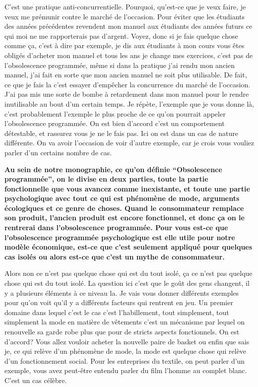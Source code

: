 \begin{small}
C'est une pratique anti-concurrentielle. Pourquoi, qu'est-ce que je veux faire, je veux me prémunir contre le marché de l'occasion. Pour éviter que les étudiants des années précédentes revendent mon manuel aux étudiants des années futurs ce qui moi ne me rapporterais pas d'argent. Voyez, donc si je fais quelque chose comme ça, c'est à dire par exemple, je dis aux étudiants à mon cours vous êtes obligés d'acheter mon manuel et tous les ans je change mes exercices, c'est pas de l'obsolescence programmée, même si dans la pratique j'ai rendu mon ancien manuel, j'ai fait en sorte que mon ancien manuel ne soit plus utilisable. De fait, ce que je fais la c'est essayer d'empêcher la concurrence du marché de l'occasion. J'ai pas mis une sorte de bombe à retardement dans mon manuel pour le rendre inutilisable au bout d'un certain temps. Je répète, l'exemple que je vous donne là, c'est probablement l'exemple le plus proche de ce qu'on pourrait appeler l'obsolescence programmée. On est bien d'accord c'est un comportement détestable, et rassurez vous je ne le fais pas. Ici on est dans un cas de nature différente. On va avoir l'occasion de voir d'autre exemple, car je crois vous vouliez parler d'un certains nombre de cas.

\smallbreak\textbf{
Au sein de notre monographie, ce qu'on définie “Obsolescence programmée”, on le divise en deux parties, toute la partie fonctionnelle que vous avancez comme inexistante, et toute une partie psychologique avec tout ce qui est phénomène de mode, arguments écologiques et ce genre de choses. Quand le consommateur remplace son produit, l'ancien produit est encore fonctionnel, et donc ça on le rentrerai dans l'obsolescence programmée. Pour vous est-ce que l'obsolescence programmée psychologique est elle utile pour notre modèle économique, est-ce que c'est seulement appliqué pour quelques cas isolés ou alors est-ce que c'est un mythe de consommateur.
}\smallbreak

Alors non ce n'est pas quelque chose qui est du tout isolé, ça ce n'est pas quelque chose qui est du tout isolé. La question ici c'est que le goût des gens changent, il y a plusieurs éléments à ce niveau la. Je vais vous donner différents exemples pour qu'on voit qu'il y a différents facteurs qui rentrent en jeu. Un premier domaine dans lequel c'est le cas c'est l'habillement, tout simplement, tout simplement la mode en matière de vêtements c'est un mécanisme par lequel on renouvelle sa garde robe plus que pour de stricts aspects fonctionnels. On est d'accord? Vous allez vouloir acheter la nouvelle paire de basket ou enfin que sais je, ce qui relève d'un phénomène de mode, la mode est quelque chose qui relève d'un fonctionnement social. Pour les entreprises du textile, on peut parler d'un exemple, vous avez peut-être entendu parler du film l'homme au complet blanc. C'est un cas célèbre.


\end{small}
